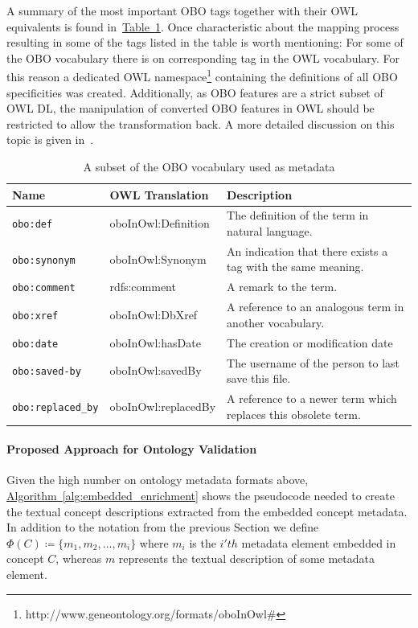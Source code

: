 \documentclass[draft,final]{vutinfth} %
\begin{document}
A summary of the most important OBO tags together with their OWL equivalents is found in~\hyperref[table:obo]{Table~\ref*{table:obo}}. Once characteristic about the mapping process resulting in some of the tags listed in the table is worth mentioning: For some of the OBO vocabulary there is on corresponding tag in the OWL vocabulary. For this reason a dedicated OWL namespace\footnote{http://www.geneontology.org/formats/oboInOwl\#} containing the definitions of all OBO specificities was created. Additionally, as OBO features are a strict subset of OWL DL, the manipulation of converted OBO features in OWL should be restricted to allow the transformation back. A more detailed discussion on this topic is given in~\cite{tirmizi2011, tirmizi2006}.

\begingroup
\renewcommand{\arraystretch}{2}
\begin{table}
	\begin{tabularx}{\textwidth}{l|l|X}
		\textbf{Name} & \textbf{OWL Translation} & \textbf{Description} \\
		\hline
        \texttt{obo:def} & oboInOwl:Definition & The definition of the term in natural language.\\
		\texttt{obo:synonym} & oboInOwl:Synonym & An indication that there exists a tag with the same meaning.\\
		\texttt{obo:comment} & rdfs:comment & A remark to the term. \\
		\texttt{obo:xref} & oboInOwl:DbXref & A reference to an analogous term in another vocabulary.\\
		\texttt{obo:date} & oboInOwl:hasDate & The creation or modification date\\
		\texttt{obo:saved-by} & oboInOwl:savedBy & The username of the person to last save this file.\\
		\texttt{obo:replaced\_by} & oboInOwl:replacedBy & A reference to a newer term which replaces this obsolete term.\\
	\end{tabularx}
	\caption{A subset of the OBO vocabulary used as metadata}
	\label{table:obo}
\end{table}
\endgroup

\paragraph{Proposed Approach for Ontology Validation} Given the high number on ontology metadata formats above, \hyperref[alg:embedded_enrichment]{Algorithm~\ref*{alg:embedded_enrichment}} shows the pseudocode needed to create the textual concept descriptions extracted from the embedded concept metadata. In addition to the notation from the previous Section we define $\Phi(C) \coloneqq \{m_1, m_2, \ldots, m_i \}$ where $m_i$ is the $i'th$ metadata element embedded in concept $C$, whereas $m$ represents the textual description of some metadata element.
\end{document}
